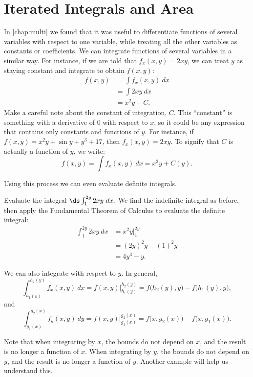 \section{Iterated Integrals and Area}\label{sec:iterated_integrals}

In \autoref{chap:multi} we found that it was useful to differentiate functions of several variables with respect to one variable, while treating all the other variables as constants or coefficients. We can integrate functions of several variables in a similar way. For instance, if we are told that $f_x(x,y) = 2xy$, we can treat $y$ as staying constant and integrate to obtain $f(x,y)$:
\begin{align*}
	f(x,y)
	&= \int f_x(x,y)\ dx\\
	&= \int 2xy\ dx \\
	&= x^2y + C.
\end{align*}
Make a careful note about the constant of integration, $C$. This ``constant'' is something with a derivative of $0$ with respect to $x$, so it could be any expression that contains only constants and functions of $y$. For instance, if $f(x,y) = x^2y+ \sin y + y^3 + 17$, then $f_x(x,y) = 2xy$. To signify that $C$ is actually a function of $y$, we write:
\[f(x,y) = \int f_x(x,y)\ dx  = x^2y+C(y).\]

Using this process we can even evaluate definite integrals.

\begin{example}\label{ex_iterated1}
Evaluate the integral $\ds \int_1^{2y} 2xy\ dx$.
\solution
We find the indefinite integral as before, then apply the Fundamental Theorem of Calculus to evaluate the definite integral:
\begin{align*}
 \int_1^{2y} 2xy\ dx
 &= x^2y\Big|_1^{2y}\\
 &= (2y)^2y - (1)^2y \\
 &= 4y^3-y.
\end{align*}
\end{example}

We can also integrate with respect to $y$. In general,
\[\int_{h_1(y)}^{h_2(y)} f_x(x,y)\ dx = f(x,y)\Big|_{h_1(y)}^{h_2(y)} = f\bigl(h_2(y),y\bigr)-f\bigl(h_1(y),y\bigr),\]
and
\[\int_{g_1(x)}^{g_2(x)} f_y(x,y)\ dy = f(x,y)\Big|_{g_1(x)}^{g_2(x)} = f\bigl(x,g_2(x)\bigr)-f\bigl(x,g_1(x)\bigr).\]

Note that when integrating by $x$, the bounds do not depend on $x$, and the result is no longer a function of $x$.  When integrating by $y$, the bounds do not depend on $y$, and the result is no longer a function of $y$. Another example will help us understand this.

